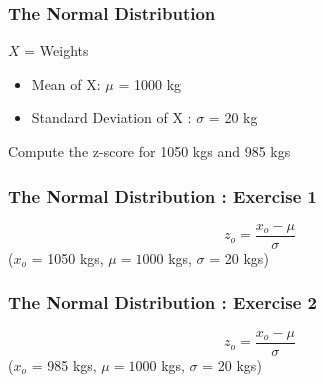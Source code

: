 \documentclass{beamer}
\begin{document}


\begin{frame}
\frametitle{The Normal Distribution}

{\LARGE

$X$ = Weights
\bigskip
\begin{itemize}
\item Mean of X:  $\mu$ = 1000 kg 
\item Standard Deviation of X : $\sigma$ = 20 kg
\end{itemize}
\bigskip
Compute the z-score for 1050 kgs and 985 kgs

}
\end{frame}

\begin{frame}
\frametitle{The Normal Distribution :  Exercise 1}
{\LARGE

\vspace{-2.9cm}
\[ z_o = \frac{x_o - \mu}{\sigma}  \]
($x_o$ = 1050 kgs, $\mu = 1000$ kgs, $\sigma$ = 20 kgs)





}
\end{frame}

\begin{frame}
\frametitle{The Normal Distribution :  Exercise 2}
{\LARGE

\vspace{-2.9cm}
\[ z_o = \frac{x_o - \mu}{\sigma}  \]
($x_o$ = 985 kgs, $\mu = 1000$ kgs, $\sigma$ = 20 kgs)





}
\end{frame}
\end{document}
